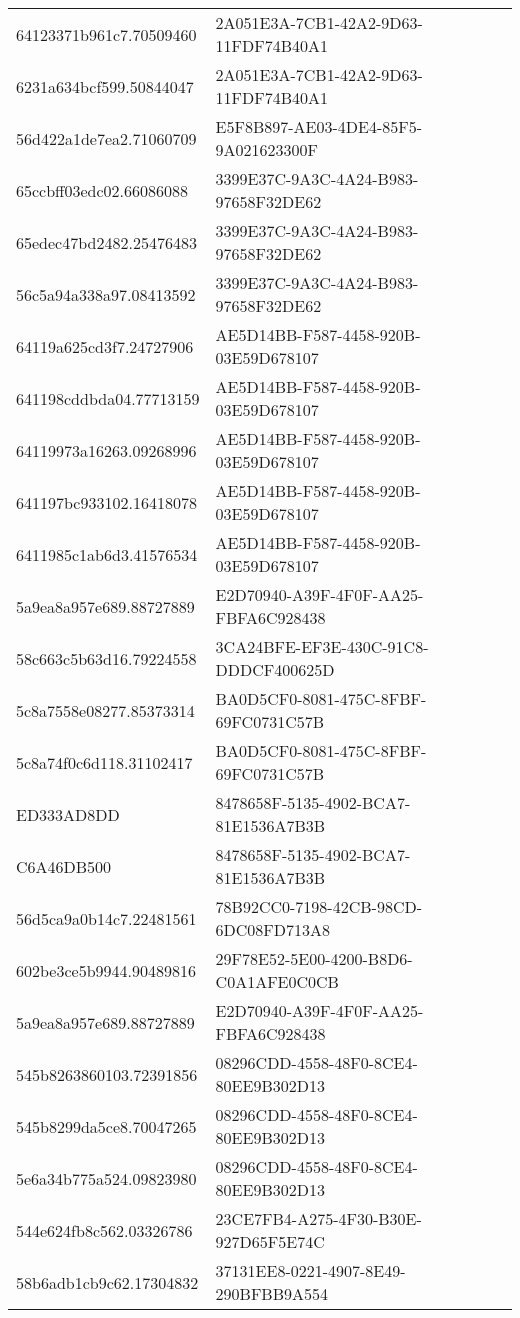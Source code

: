 \begin{tabular}{ll}
64123371b961c7.70509460 & 2A051E3A-7CB1-42A2-9D63-11FDF74B40A1 \\
6231a634bcf599.50844047 & 2A051E3A-7CB1-42A2-9D63-11FDF74B40A1 \\
56d422a1de7ea2.71060709 & E5F8B897-AE03-4DE4-85F5-9A021623300F \\
65ccbff03edc02.66086088 & 3399E37C-9A3C-4A24-B983-97658F32DE62 \\
65edec47bd2482.25476483 & 3399E37C-9A3C-4A24-B983-97658F32DE62 \\
56c5a94a338a97.08413592 & 3399E37C-9A3C-4A24-B983-97658F32DE62 \\
64119a625cd3f7.24727906 & AE5D14BB-F587-4458-920B-03E59D678107 \\
641198cddbda04.77713159 & AE5D14BB-F587-4458-920B-03E59D678107 \\
64119973a16263.09268996 & AE5D14BB-F587-4458-920B-03E59D678107 \\
641197bc933102.16418078 & AE5D14BB-F587-4458-920B-03E59D678107 \\
6411985c1ab6d3.41576534 & AE5D14BB-F587-4458-920B-03E59D678107 \\
5a9ea8a957e689.88727889 & E2D70940-A39F-4F0F-AA25-FBFA6C928438 \\
58c663c5b63d16.79224558 & 3CA24BFE-EF3E-430C-91C8-DDDCF400625D \\
5c8a7558e08277.85373314 & BA0D5CF0-8081-475C-8FBF-69FC0731C57B \\
5c8a74f0c6d118.31102417 & BA0D5CF0-8081-475C-8FBF-69FC0731C57B \\
ED333AD8DD & 8478658F-5135-4902-BCA7-81E1536A7B3B \\
C6A46DB500 & 8478658F-5135-4902-BCA7-81E1536A7B3B \\
56d5ca9a0b14c7.22481561 & 78B92CC0-7198-42CB-98CD-6DC08FD713A8 \\
602be3ce5b9944.90489816 & 29F78E52-5E00-4200-B8D6-C0A1AFE0C0CB \\
5a9ea8a957e689.88727889 & E2D70940-A39F-4F0F-AA25-FBFA6C928438 \\
545b8263860103.72391856 & 08296CDD-4558-48F0-8CE4-80EE9B302D13 \\
545b8299da5ce8.70047265 & 08296CDD-4558-48F0-8CE4-80EE9B302D13 \\
5e6a34b775a524.09823980 & 08296CDD-4558-48F0-8CE4-80EE9B302D13 \\
544e624fb8c562.03326786 & 23CE7FB4-A275-4F30-B30E-927D65F5E74C \\
58b6adb1cb9c62.17304832 & 37131EE8-0221-4907-8E49-290BFBB9A554 \\

\end{tabular}
